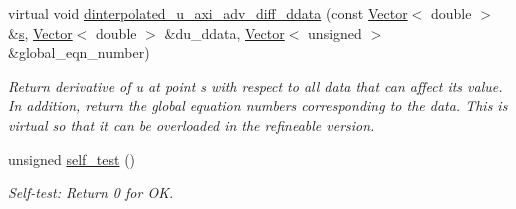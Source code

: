 \begin{DoxyCompactItemize}
virtual void \hyperlink{classoomph_1_1AxisymAdvectionDiffusionEquations_a83fd782e690a7ca9f6ac4995c964e4b5}{dinterpolated\+\_\+u\+\_\+axi\+\_\+adv\+\_\+diff\+\_\+ddata} (const \hyperlink{classoomph_1_1Vector}{Vector}$<$ double $>$ \&\hyperlink{cfortran_8h_ab7123126e4885ef647dd9c6e3807a21c}{s}, \hyperlink{classoomph_1_1Vector}{Vector}$<$ double $>$ \&du\+\_\+ddata, \hyperlink{classoomph_1_1Vector}{Vector}$<$ unsigned $>$ \&global\+\_\+eqn\+\_\+number)
\begin{DoxyCompactList}\small\item\em Return derivative of u at point s with respect to all data that can affect its value. In addition, return the global equation numbers corresponding to the data. This is virtual so that it can be overloaded in the refineable version. \end{DoxyCompactList}\item 
unsigned \hyperlink{classoomph_1_1AxisymAdvectionDiffusionEquations_a43146d9ddd728dd85340629acb726183}{self\+\_\+test} ()
\begin{DoxyCompactList}\small\item\em Self-\/test\+: Return 0 for OK. \end{DoxyCompactList}\end{DoxyCompactItemize}
